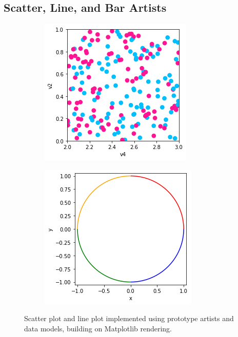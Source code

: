 \documentclass[../main.tex]{subfiles}
\begin{document}
 \subsection{Scatter, Line, and Bar Artists}
 \label{sec:code:artists}
 \begin{figure}[H]
    \centering 
    \begin{subfigure}{.49\textwidth}
        \includegraphics[width=\textwidth]{figures/code/scatter_0.png}
        \caption{}
        \label{fig:code:scatter}
    \end{subfigure}
    \begin{subfigure}{.48\textwidth}
        \includegraphics[width=\textwidth]{figures/code/line_1.png}
        \caption{}
        \label{fig:code:line}
    \end{subfigure}
  \caption{Scatter plot and line plot implemented using prototype artists and data models, building on Matplotlib rendering.}
  \label{fig:code:scatter_line}
\end{figure}
\end{document}
